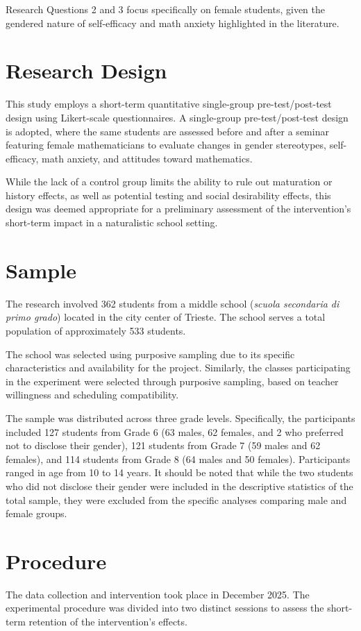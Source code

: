 Research Questions 2 and 3 focus specifically on female students, given the gendered nature of self-efficacy and math anxiety highlighted in the literature.

\section{Research Design}

This study employs a short-term quantitative single-group pre-test/post-test design using Likert-scale questionnaires. A single-group pre-test/post-test design is adopted, where the same students are assessed before and after a seminar featuring female mathematicians to evaluate changes in gender stereotypes, self-efficacy, math anxiety, and attitudes toward mathematics.

While the lack of a control group limits the ability to rule out maturation or history effects, as well as potential testing and social desirability effects, this design was deemed appropriate for a preliminary assessment of the intervention's short-term impact in a naturalistic school setting.


\section{Sample}
The research involved 362 students from a middle school (\textit{scuola secondaria di primo grado}) located in the city center of Trieste. The school serves a total population of approximately 533 students.

The school was selected using purposive sampling due to its specific characteristics and availability for the project. Similarly, the classes participating in the experiment were selected through purposive sampling, based on teacher willingness and scheduling compatibility.

The sample was distributed across three grade levels. Specifically, the participants included 127 students from Grade 6 (63 males, 62 females, and 2 who preferred not to disclose their gender), 121 students from Grade 7 (59 males and 62 females), and 114 students from Grade 8 (64 males and 50 females). Participants ranged in age from 10 to 14 years. It should be noted that while the two students who did not disclose their gender were included in the descriptive statistics of the total sample, they were excluded from the specific analyses comparing male and female groups.

\section{Procedure}
The data collection and intervention took place in December 2025. The experimental procedure was divided into two distinct sessions to assess the short-term retention of the intervention's effects.

